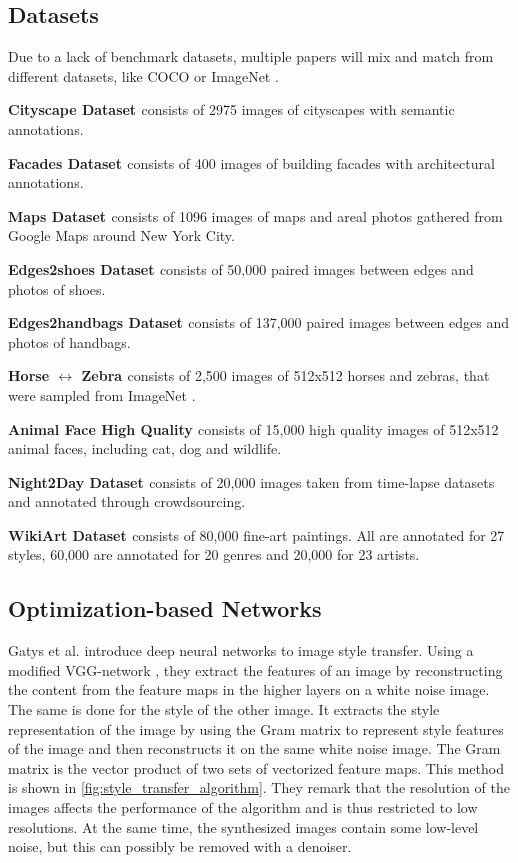 \subsection{Datasets}
Due to a lack of benchmark datasets, multiple papers will mix and match from different datasets, like \gls{COCO} or ImageNet \cite{Deng2009}.

\textbf{Cityscape Dataset \cite{Cordts2016}} consists of 2975 images of cityscapes with semantic annotations.

\textbf{Facades Dataset \cite{Tylecek2013}} consists of 400 images of building facades with architectural annotations.

\textbf{Maps Dataset \cite{Isola2016}} consists of 1096 images of maps and areal photos gathered from Google Maps around New York City.

\textbf{Edges2shoes Dataset \cite{Yu2014}} consists of 50,000 paired images between edges and photos of shoes.

\textbf{Edges2handbags Dataset \cite{Zhu2016}} consists of 137,000 paired images between edges and photos of handbags.

\textbf{Horse $\leftrightarrow$ Zebra \cite{Zhu2017}} consists of 2,500 images of 512x512 horses and zebras, that were sampled from ImageNet \cite{Deng2009}.

\textbf{Animal Face High Quality \cite{Choi2019}} consists of 15,000 high quality images of 512x512 animal faces, including cat, dog and wildlife.

\textbf{Night2Day Dataset \cite{Laffont2014}} consists of 20,000 images taken from time-lapse datasets and annotated through crowdsourcing.

\textbf{WikiArt Dataset \cite{Saleh2015}} consists of 80,000 fine-art paintings.
All are annotated for 27 styles, 60,000 are annotated for 20 genres and 20,000 for 23 artists.

\subsection{Optimization-based Networks}
Gatys et al. \cite{Gatys2016} introduce deep neural networks to image style transfer.
Using a modified VGG-network \cite{Simonyan2015}, they extract the features of an image by reconstructing the content from the feature maps in the higher layers on a white noise image.
The same is done for the style of the other image.
It extracts the style representation of the image by using the Gram matrix to represent style features of the image and then reconstructs it on the same white noise image.
The Gram matrix is the vector product of two sets of vectorized feature maps.
This method is shown in \ref{fig:style_transfer_algorithm}.
They remark that the resolution of the images affects the performance of the algorithm and is thus restricted to low resolutions.
At the same time, the synthesized images contain some low-level noise, but this can possibly be removed with a denoiser.

